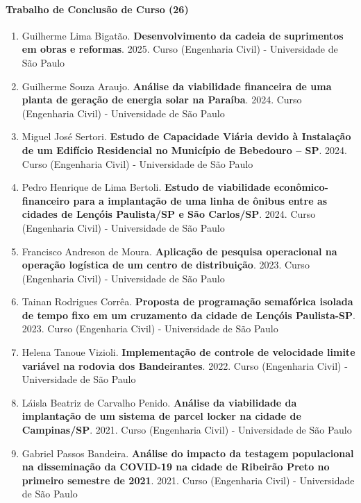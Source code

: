 \documentclass[
  brazilian,
  11pt,
  a4paper,
]{article}
\begin{document}
\paragraph{Trabalho de Conclusão de Curso
(26)}\label{trabalho-de-conclusuxe3o-de-curso-26}

\begin{enumerate}
\def\labelenumi{\arabic{enumi}.}
\item
  Guilherme Lima Bigatão. \textbf{Desenvolvimento da cadeia de
  suprimentos em obras e reformas}. 2025. Curso (Engenharia Civil) -
  Universidade de São Paulo
\item
  Guilherme Souza Araujo. \textbf{Análise da viabilidade financeira de
  uma planta de geração de energia solar na Paraíba}. 2024. Curso
  (Engenharia Civil) - Universidade de São Paulo
\item
  Miguel José Sertori. \textbf{Estudo de Capacidade Viária devido à
  Instalação de um Edifício Residencial no Município de Bebedouro --
  SP}. 2024. Curso (Engenharia Civil) - Universidade de São Paulo
\item
  Pedro Henrique de Lima Bertoli. \textbf{Estudo de viabilidade
  econômico-financeiro para a implantação de uma linha de ônibus entre
  as cidades de Lençóis Paulista/SP e São Carlos/SP}. 2024. Curso
  (Engenharia Civil) - Universidade de São Paulo
\item
  Francisco Andreson de Moura. \textbf{Aplicação de pesquisa operacional
  na operação logística de um centro de distribuição}. 2023. Curso
  (Engenharia Civil) - Universidade de São Paulo
\item
  Tainan Rodrigues Corrêa. \textbf{Proposta de programação semafórica
  isolada de tempo fixo em um cruzamento da cidade de Lençóis
  Paulista-SP}. 2023. Curso (Engenharia Civil) - Universidade de São
  Paulo
\item
  Helena Tanoue Vizioli. \textbf{Implementação de controle de velocidade
  limite variável na rodovia dos Bandeirantes}. 2022. Curso (Engenharia
  Civil) - Universidade de São Paulo
\item
  Láisla Beatriz de Carvalho Penido. \textbf{Análise da viabilidade da
  implantação de um sistema de parcel locker na cidade de Campinas/SP}.
  2021. Curso (Engenharia Civil) - Universidade de São Paulo
\item
  Gabriel Passos Bandeira. \textbf{Análise do impacto da testagem
  populacional na disseminação da COVID-19 na cidade de Ribeirão Preto
  no primeiro semestre de 2021}. 2021. Curso (Engenharia Civil) -
  Universidade de São Paulo

\end{enumerate}
\end{document}

